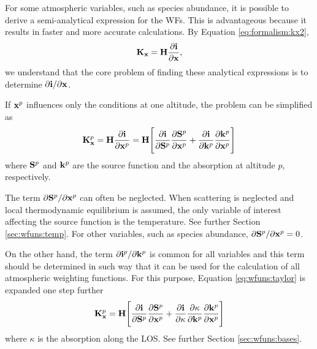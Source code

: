   For some atmospheric variables, such as species abundance, it is
  possible to derive a semi-analytical expression for the WFs. This is
  advantageous because it results in faster and more accurate
  calculations. By Equation \ref{eq:formalism:kx2},
  \begin{eqnarray*}
    \mathbf{K_x} = \mathbf{H}\frac{\partial\mathbf{i}}{\partial \mathbf{x}},
  \end{eqnarray*}
  we understand that the core problem of finding these analytical
  expressions is to determine $\partial\mathbf{i} / \partial \mathbf{x}$. 
  
  If $\mathbf{x}^p$ influences only the conditions at one altitude, the
  problem can be simplified as \citep[Eq. 43 ][]{eriksson:00a}
  \begin{equation}
    \mathbf{K}_{\mathbf{x}}^p = \mathbf{H} \frac{\partial\mathbf{i}}{\partial \mathbf{x}^p} = 
      \mathbf{H} \Bigg[ \frac{\partial\mathbf{i}}{\partial \mathbf{S}^p}
                 \frac{\partial \mathbf{S}^p}{\partial \mathbf{x}^p} +
                 \frac{\partial\mathbf{i}}{\partial \mathbf{k}^p}
                 \frac{\partial \mathbf{k}^p}{\partial \mathbf{x}^p} \Bigg]
   \label{eq:wfuns:taylor}
  \end{equation}
  where $\mathbf{S}^p$ and $\mathbf{k}^p$ are the source function and the
  absorption at altitude $p$, respectively.
  
  The term $\partial \mathbf{S}^p/\partial \mathbf{x}^p$ can often be neglected.
  When scattering is neglected and local thermodynamic equilibrium is
  assumed, the only variable of interest affecting the source function
  is the temperature.  See further Section \ref{sec:wfuns:temp}. For
  other variables, such as species abundance, $\partial
  \mathbf{S}^p/\partial \mathbf{x}^p=0$.
  
  On the other hand, the term $\partial \mathbf{i}^p/\partial \mathbf{k}^p$ is
  common for all variables and this term should be determined in such
  way that it can be used for the calculation of all atmospheric
  weighting functions. For this purpose, Equation
  \ref{eq:wfuns:taylor} is expanded one step further
  \begin{equation}
    \mathbf{K}_{\mathbf{x}}^p = \mathbf{H} \Bigg[ \frac{\partial\mathbf{i}}{\partial \mathbf{S}^p}
                 \frac{\partial \mathbf{S}^p}{\partial \mathbf{x}^p} +
                 \frac{\partial\mathbf{i}}{\partial \kappa}
                 \frac{\partial \kappa}{\partial \mathbf{k}^p}
                 \frac{\partial \mathbf{k}^p}{\partial \mathbf{x}^p} \Bigg]
   \label{eq:wfuns:taylor2}
  \end{equation}
  where $\kappa$ is the absorption along the LOS. See further Section
  \ref{sec:wfuns:bases}.
  
